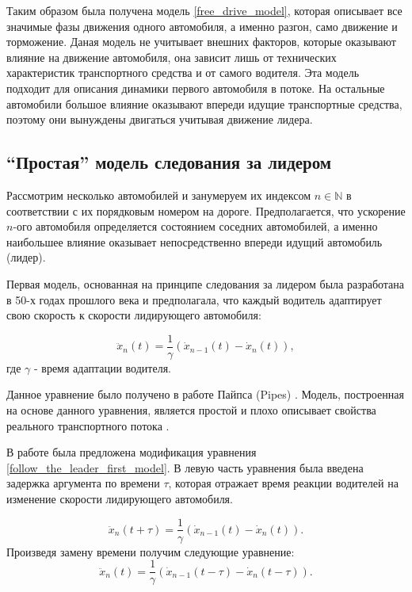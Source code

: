 \documentclass[12pt, a4paper]{extarticle}
\numberwithin{equation}{section}
\numberwithin{figure}{section}
\begin{document}
Таким образом была получена модель \eqref{free_drive_model}, которая описывает все значимые фазы движения одного автомобиля, а именно разгон, само движение и торможение. Даная модель не учитывает внешних факторов, которые оказывают влияние на движение автомобиля, она зависит лишь от технических характеристик транспортного средства и от самого водителя. Эта модель подходит для описания динамики первого автомобиля в потоке. На остальные автомобили большое влияние оказывают впереди идущие транспортные средства, поэтому они вынуждены двигаться учитывая движение лидера.

\subsection{``Простая'' модель следования за лидером}

Рассмотрим несколько автомобилей и занумеруем их индексом $n \in \mathbb{N}$ в соответствии с их порядковым номером на дороге. Предполагается, что ускорение $n$-ого автомобиля определяется состоянием соседних автомобилей, а именно наибольшее влияние оказывает непосредственно впереди идущий автомобиль (лидер).

Первая модель, основанная на принципе следования за лидером была разработана в 50-х годах прошлого века и предполагала, что каждый водитель адаптирует свою скорость к скорости лидирующего автомобиля:

\begin{equation} \label{follow_the_leader_first_model}
\ddot{x}_n(t) = \dfrac{1}{\gamma} (\dot{x}_{n-1}(t) - \dot{x}_{n}(t)), 
\end{equation}
где $\gamma$ - время адаптации водителя.

Данное уравнение было получено в работе Пайпса (Pipes) \cite{FirstFollowTheLeaderModel}. Модель, построенная на основе данного уравнения, является простой и плохо описывает свойства реального транспортного потока \cite{Shvetsov}.

В работе \cite{RefineFirstFollowTheLeaderModel} была предложена модификация уравнения \eqref{follow_the_leader_first_model}. В левую часть уравнения была введена задержка аргумента по времени $\tau$, которая отражает время реакции водителей на изменение скорости лидирующего автомобиля. 

\begin{equation*}
\ddot{x}_n(t+\tau) = \dfrac{1}{\gamma} (\dot{x}_{n-1}(t) - \dot{x}_{n}(t)).
\end{equation*}
Произведя замену времени получим следующие уравнение:
\begin{equation} \label{follow_the_leader_with_two_delay}
\ddot{x}_n(t) = \dfrac{1}{\gamma} (\dot{x}_{n-1}(t-\tau) - \dot{x}_{n}(t-\tau)).
\end{equation}
\end{document}
